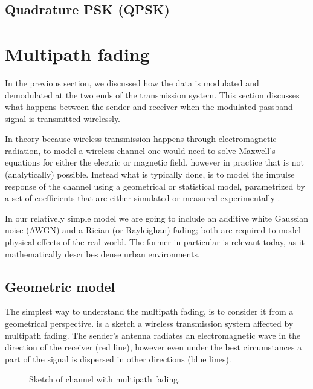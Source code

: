 \subsection{Quadrature PSK (QPSK)}


\section{Multipath fading} \label{sec:multipath-fading}

In the previous section, we discussed how the data is modulated and demodulated at the two ends of the transmission system. This section discusses what happens between the sender and receiver when the modulated passband signal is transmitted wirelessly.

In theory because wireless transmission happens through electromagnetic radiation, to model a wireless channel one would need to solve Maxwell's equations for either the electric or magnetic field, however in practice that is not (analytically) possible. Instead what is typically done, is to model the impulse response of the channel using a geometrical or statistical model, parametrized by a set of coefficients that are either simulated or measured experimentally \cite{Gallager}.

In our relatively simple model we are going to include an additive white Gaussian noise (AWGN) and a Rician (or Rayleighan) fading; both are required to model physical effects of the real world. The former in particular is relevant today, as it mathematically describes dense urban environments.

\subsection{Geometric model}

The simplest way to understand the multipath fading, is to consider it from a geometrical perspective.  is a sketch a wireless transmission system affected by multipath fading. The sender's antenna radiates an electromagnetic wave in the direction of the receiver (red line), however even under the best circumstances a part of the signal is dispersed in other directions (blue lines).

\begin{figure}
	\centering
	
	\caption{
		Sketch of channel with multipath fading.
		\label{fig:multipath-sketch}
	}
\end{figure}

